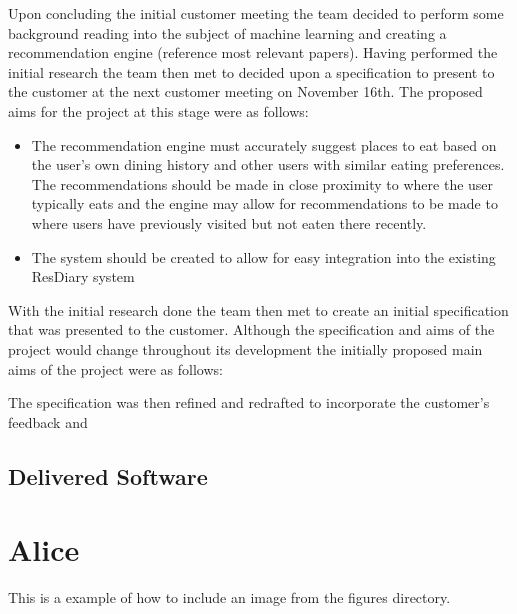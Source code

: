\documentclass{l3proj}
\begin{document}
Upon concluding the initial customer meeting the team decided to perform some
background reading into the subject of machine learning and creating a recommendation
engine (reference most relevant papers). Having performed the initial
research the team then met to decided upon a specification to present
to the customer at the next customer meeting on November 16th. The proposed
aims for the project at this stage were as follows:
\begin{itemize}
\item The recommendation engine must accurately suggest places to eat
  based on the user's own dining history and other users with similar
  eating preferences. The recommendations should be made in close
  proximity to where the user typically eats and the engine may allow
  for recommendations to be made to where users have previously
  visited but not eaten there recently.
\item The system should be created to allow for easy integration into
  the existing ResDiary system 
\end{itemize}

 With the initial research done the team then met to create an
initial specification that was presented to the customer. Although
the specification and aims of the project would change throughout
its development the initially proposed main aims of the project were
as follows:

The specification was then refined and redrafted to incorporate the
customer's feedback and  

\subsection{Delivered Software}
\label{finsoftware}

\newpage

\section{Alice}
\label{sec:alice}

This is a example of how to include an image from the figures directory.


\end{document}
